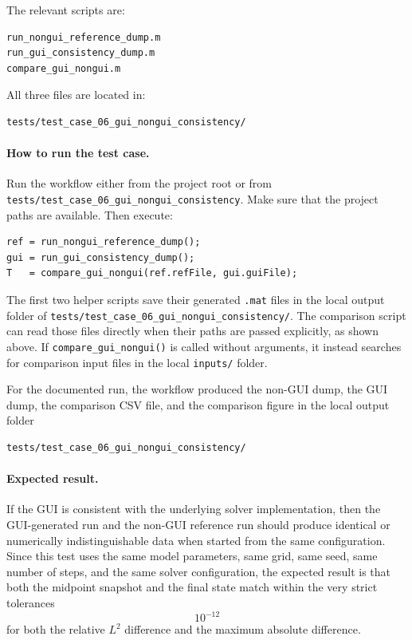 The relevant scripts are:
\begin{verbatim}
run_nongui_reference_dump.m
run_gui_consistency_dump.m
compare_gui_nongui.m
\end{verbatim}

All three files are located in:
\begin{verbatim}
tests/test_case_06_gui_nongui_consistency/
\end{verbatim}

\paragraph{How to run the test case.}
Run the workflow either from the project root or from
\texttt{tests/test\_case\_06\_gui\_nongui\_consistency}. Make sure that the project paths are available. Then execute:
\begin{verbatim}
ref = run_nongui_reference_dump();
gui = run_gui_consistency_dump();
T   = compare_gui_nongui(ref.refFile, gui.guiFile);
\end{verbatim}

The first two helper scripts save their generated \texttt{.mat} files in the local output folder of
\texttt{tests/test\_case\_06\_gui\_nongui\_consistency/}. The comparison script can read those files directly when their paths are passed explicitly, as shown above. If \texttt{compare\_gui\_nongui()} is called without arguments, it instead searches for comparison input files in the local \texttt{inputs/} folder.

For the documented run, the workflow produced the non-GUI dump, the GUI dump, the comparison CSV file, and the comparison figure in the local output folder
\begin{verbatim}
tests/test_case_06_gui_nongui_consistency/
\end{verbatim}

\paragraph{Expected result.}
If the GUI is consistent with the underlying solver implementation, then the GUI-generated run and the non-GUI reference run should produce identical or numerically indistinguishable data when started from the same configuration. Since this test uses the same model parameters, same grid, same seed, same number of steps, and the same solver configuration, the expected result is that both the midpoint snapshot and the final state match within the very strict tolerances
\[
10^{-12}
\]
for both the relative \(L^2\) difference and the maximum absolute difference.

